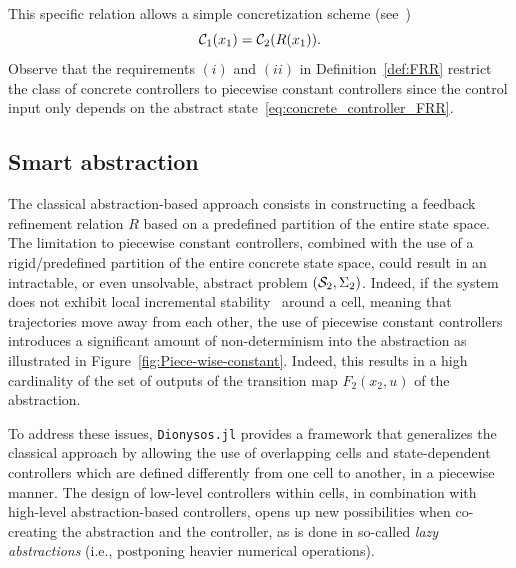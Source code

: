 \documentclass{juliacon}
\begin{document}
This specific relation allows a simple concretization scheme (see~\cite[V.4 Theorem]{reissig2016feedback})
\begin{equation}\label{eq:concrete_controller_FRR}
    \mathcal{C}_1(x_1) = \mathcal{C}_2(R(x_1)).
\end{equation}
Observe that the requirements $(i)$ and $(ii)$ in Definition~\ref{def:FRR} restrict the class of concrete controllers to piecewise constant controllers since the control input only depends on the abstract state~\eqref{eq:concrete_controller_FRR}. 

\subsection{Smart abstraction} 

The classical abstraction-based approach consists in constructing a feedback refinement relation $R$ based on a predefined partition of the entire state space. 
The limitation to piecewise constant controllers, combined with the use of a rigid/predefined partition of the entire concrete state space, could result in an intractable, or even unsolvable, abstract problem $(\mathcal{S}_2, \Sigma_2)$.
Indeed, if the system does not exhibit local incremental stability~\cite[Definition 2.1]{angeli2002lyapunov}\cite{lohmiller1998contraction} around a cell, meaning that trajectories move away from each other, the use of piecewise constant controllers introduces a significant amount of non-determinism into the abstraction as illustrated in Figure~\ref{fig:Piece-wise-constant}. 
%
Indeed, this results in a high cardinality of the set of 
outputs of the transition map $F_2(x_2,u)$ of the abstraction.
\vskip 6pt

To address these issues, \texttt{Dionysos.jl} provides a framework that generalizes the classical approach by allowing the use of overlapping cells and state-dependent controllers which are defined differently from one cell to another, in a piecewise manner.
The design of low-level controllers within cells, in combination with high-level abstraction-based controllers, opens up new possibilities when co-creating the abstraction and the controller, as is done in so-called \emph{lazy abstractions} (i.e., postponing heavier numerical operations).
\end{document}
